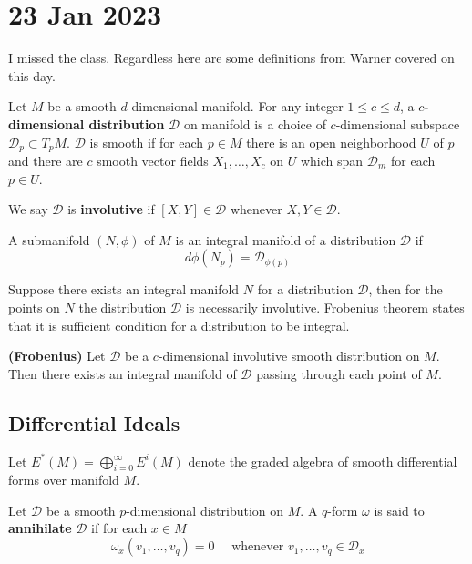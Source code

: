 \documentclass[11pt,a4paper]{scrarticle}
\theoremstyle{definition}
\theoremstyle{greenbox}
\begin{document}
    \section{23 Jan 2023}

    I missed the class. Regardless here are some definitions from Warner covered on this day.

    \begin{defn}
        Let $ M $ be a smooth $ d$-dimensional manifold. For any integer $ 1 \le c \le d $, a \textbf{$ c $-dimensional distribution} $ \mathscr{D} $ on manifold is a choice of $ c $-dimensional subspace $ \mathscr{D}_{p} \subset T_{p}M $. $ \mathscr{D} $ is smooth if for each $ p \in M $ there is an open neighborhood $ U $ of $ p $ and there are $ c $  smooth vector fields $ X_{1}, \ldots , X_{c} $  on $ U $ which span $ \mathscr{D}_{m} $ for each $ p \in U $.

        We say $ \mathscr{D} $ is \textbf{involutive}  if $ [X,Y] \in \mathscr{D} $ whenever $ X,Y \in \mathscr{D} $.
    \end{defn}

    \begin{defn}
        A submanifold $ (N, \phi) $ of $ M$ is an integral manifold of a distribution $ \mathscr{D} $ if 
        \[ d \phi(N_{p}) = \mathscr{D}_{\phi(p)} \]
    \end{defn}

    Suppose there exists an integral manifold $ N $ for a distribution $ \mathscr{D} $, then for the points on $ N $ the distribution $ \mathscr{D} $ is necessarily involutive. Frobenius theorem states that it is sufficient condition for a distribution to be integral. 

    \begin{thm}
        \textbf{(Frobenius)}  Let $ \mathscr{D} $ be a $ c $-dimensional involutive smooth distribution on $ M $. Then there exists an integral manifold of $ \mathscr{D} $ passing through each point of $ M $.
    \end{thm}

    \subsection*{Differential Ideals}

    Let $ E^{*}(M)  = \bigoplus_{i=0}^{\infty} E^{i}(M) $ denote the graded algebra of smooth differential forms over manifold $ M $. 
    \begin{defn}
        Let $ \mathscr{D} $ be a smooth $ p$-dimensional distribution on $ M $. A $ q $-form $ \omega $ is said to \textbf{annihilate} $ \mathscr{D} $ if for each $ x \in M $ 
        \[ \omega_{x}\left(v_{1}, \ldots , v_{q}\right) = 0 \quad\text{  whenever  }v_{1}, \ldots, v_{q} \in \mathscr{D}_{x}\]
        
    \end{defn}
\end{document}
